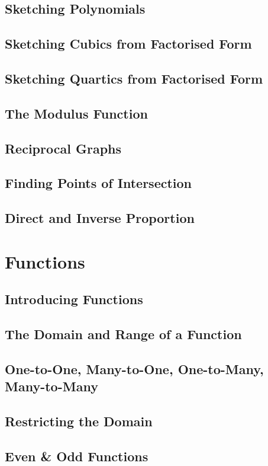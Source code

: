 \documentclass[../alevelmaths.tex]{subfiles}
\begin{document}
\subsection*{Sketching Polynomials}
\subsection*{Sketching Cubics from Factorised Form}
\subsection*{Sketching Quartics from Factorised Form}
\subsection*{The Modulus Function}
\subsection*{Reciprocal Graphs}
\subsection*{Finding Points of Intersection}
\subsection*{Direct and Inverse Proportion}
\section{Functions}
\subsection*{Introducing Functions}
\subsection*{The Domain and Range of a Function}
\subsection*{One-to-One, Many-to-One, One-to-Many, Many-to-Many}
\subsection*{Restricting the Domain}
\subsection*{Even \& Odd Functions}
\end{document}
